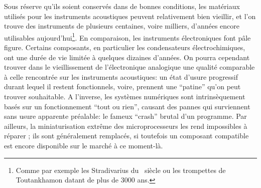 \noindent Sous réserve qu'ils soient conservés dans de bonnes conditions, les matériaux utilisés pour les instruments acoustiques peuvent relativement bien vieillir, et l'on trouve des instruments de plusieurs centaines, voire milliers, d'années encore utilisables aujourd'hui\footnote{Comme par exemple les Stradivarius du ~siècle ou les trompettes de Toutankhamon datant de plus de 3000 ans.}. En comparaison, les instruments électroniques font pâle figure. Certains composants, en particulier les condensateurs électrochimiques, ont une durée de vie limitée à quelques dizaines d'années. 
On pourra cependant trouver dans le vieillissement de l'électronique analogique une qualité comparable à celle rencontrée sur les instruments acoustiques: un état d'usure progressif durant lequel il restent fonctionnels, voire, prennent une ``patine'' qu'on peut trouver souhaitable. A l'inverse, les systèmes numériques sont intrinsèquement basés sur un fonctionnement ``tout ou rien'', causant des pannes qui surviennent sans usure apparente préalable: le fameux ``crash'' brutal d'un programme. 
Par ailleurs, la miniaturisation extrême des microprocesseurs les rend impossibles à réparer ; ils sont généralement remplacés, si toutefois un composant compatible est encore disponible sur le marché à ce moment-là.\\
